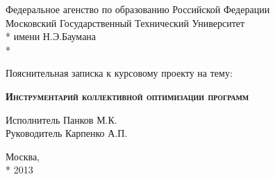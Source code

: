 \begin{titlepage}
    \newpage
    
    \begin{center}
        Федеральное агенство по образованию Российской Федерации \\
        Московский Государственный Технический Университет \\*
        имени Н.Э.Баумана \\*
        \vspace{-12mm}
        \begin{figure}[h]
        \end{figure}
        \vspace{-16mm}
        \hrulefill
    \end{center}
    \begin{center}
        \Large Пояснительная записка к курсовому проекту на тему:
    \end{center}
    
    \vspace{2.5em}
    
    \begin{center}
        \textsc{\textbf{Инструментарий коллективной оптимизации программ}}
    \end{center}
    
    \vspace{6em}
    
    \begin{flushleft}
        \hspace{8.5cm}Исполнитель \hrulefill Панков М.К. \\
        \vspace{1.5em}
        \hspace{8.5cm}Руководитель \hrulefill Карпенко А.П.\\
    \end{flushleft}
    
    \vspace{\fill}
    
    \begin{center}
        Москва, \\*
        2013
    \end{center}

\end{titlepage}